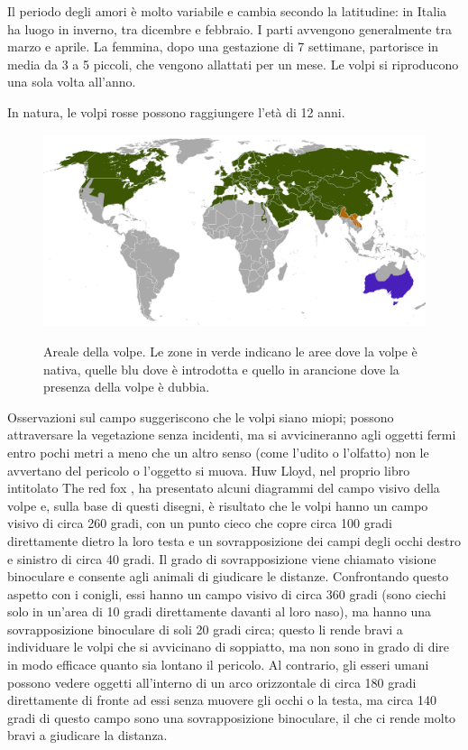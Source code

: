 \documentclass[11pt]{article}
\begin{document}
Il periodo degli amori è molto variabile e cambia secondo la latitudine: in Italia ha luogo in inverno, tra dicembre e febbraio. I parti avvengono generalmente tra marzo e aprile. La femmina, dopo una gestazione di 7 settimane, partorisce in media da 3 a 5 piccoli, che vengono allattati per un mese. Le volpi si riproducono una sola volta all'anno. 

In natura, le volpi rosse possono raggiungere l'età di 12 anni.

\begin{figure}[h]
    \centering
    \includegraphics[scale = 0.3]{ArealeDellaVolpe.png}
    \label{figArealeVolpe}
    \caption{Areale della volpe. Le zone in verde indicano le aree dove la volpe è nativa, quelle blu dove è introdotta e quello in arancione dove la presenza della volpe è dubbia. }
\end{figure}

Osservazioni sul campo\cite{RedFox} suggeriscono che le volpi siano miopi; possono attraversare la vegetazione senza incidenti, ma si avvicineranno agli oggetti fermi entro pochi metri a meno che un altro senso (come l'udito o l'olfatto) non le avvertano del pericolo o l'oggetto si muova. Huw Lloyd, nel proprio libro intitolato The red fox \cite{Zimen1980}, ha presentato alcuni diagrammi del campo visivo della volpe e, sulla base di questi disegni, è risultato che le volpi hanno un campo visivo di circa 260 gradi, con un punto cieco che copre circa 100 gradi direttamente dietro la loro testa e un sovrapposizione dei campi degli occhi destro e sinistro di circa 40 gradi. Il grado di sovrapposizione viene chiamato visione binoculare e consente agli animali di giudicare le distanze.
Confrontando questo aspetto con i conigli, essi hanno un campo visivo di circa 360 gradi (sono ciechi solo in un'area di 10 gradi direttamente davanti al loro naso), ma hanno una sovrapposizione binoculare di soli 20 gradi circa; questo li rende bravi a individuare le volpi che si avvicinano di soppiatto, ma non sono in grado di dire in modo efficace quanto sia lontano il pericolo. Al contrario, gli esseri umani possono vedere oggetti all'interno di un arco orizzontale di circa 180 gradi direttamente di fronte ad essi senza muovere gli occhi o la testa, ma circa 140 gradi di questo campo sono una sovrapposizione binoculare, il che ci rende molto bravi a giudicare la distanza.
\end{document}
